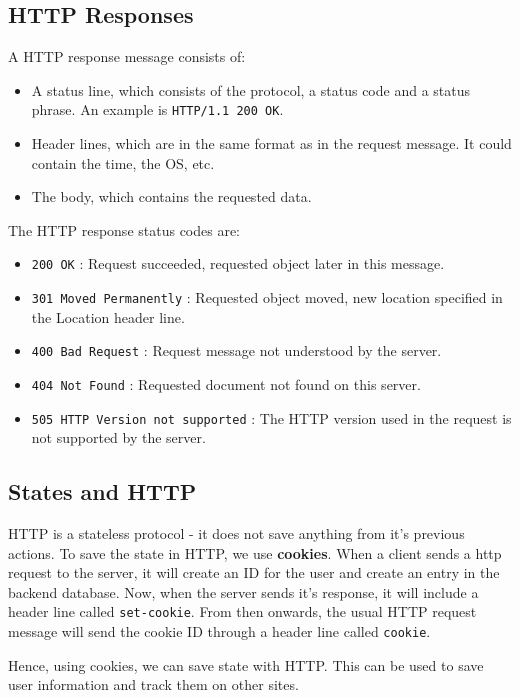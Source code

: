 \documentclass[12pt,letterpaper]{book}
\theoremstyle{definition}
\begin{document}
\subsection{HTTP Responses}

A HTTP response message consists of:

\begin{itemize}
  \item A status line, which consists of the protocol, a status code and a status phrase. An example is \texttt{HTTP/1.1 200 OK}.
  \item Header lines, which are in the same format as in the request message. It could contain the time, the OS, etc.
  \item The body, which contains the requested data.
\end{itemize}

The HTTP response status codes are:

\begin{itemize}
  \item \texttt{200 OK} : Request succeeded, requested object later in this message.
  \item \texttt{301 Moved Permanently} : Requested object moved, new location specified in the Location header line.
  \item \texttt{400 Bad Request} : Request message not understood by the server.
  \item \texttt{404 Not Found} : Requested document not found on this server.
  \item \texttt{505 HTTP Version not supported} : The HTTP version used in the request is not supported by the server.
\end{itemize}

\subsection{States and HTTP}

HTTP is a stateless protocol - it does not save anything from it's previous actions. To save the state in HTTP, we use \textbf{cookies}. When a client sends a http request to the server, it will create an ID for the user and create an entry in the backend database. Now, when the server sends it's response, it will include a header line called \texttt{set-cookie}. From then onwards, the usual HTTP request message will send the cookie ID through a header line called \texttt{cookie}.

Hence, using cookies, we can save state with HTTP. This can be used to save user information and track them on other sites.
\end{document}
